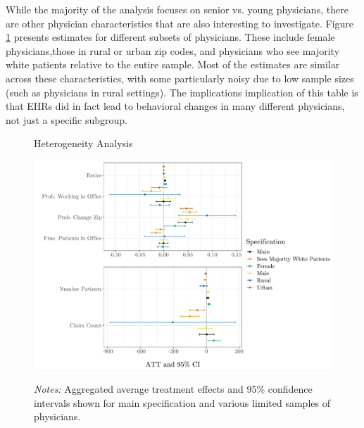 \documentclass[11pt]{article}
\begin{document}
While the majority of the analysis focuses on senior vs. young physicians, there are other physician characteristics that are also interesting to investigate. Figure \ref{fig:het} presents estimates for different subsets of physicians. These include female physicians,those in rural or urban zip codes, and physicians who see majority white patients relative to the entire sample. Most of the estimates are similar across these characteristics, with some particularly noisy due to low sample sizes (such as physicians in rural settings). The implications implication of this table is that EHRs did in fact lead to behavioral changes in many different physicians, not just a specific subgroup.  

\begin{figure}[ht]
    \centering
    \captionsetup{width=.65\linewidth}
    \caption{Heterogeneity Analysis}
    \includegraphics[scale=.65]{Objects/heterogeneity _graph.pdf}
    \label{fig:het}
    \vspace{2mm}
    \caption*{\footnotesize{\textit{Notes:} Aggregated average treatment effects and 95\% confidence intervals shown for main specification and various limited samples of physicians.}}
\end{figure}
\end{document}
